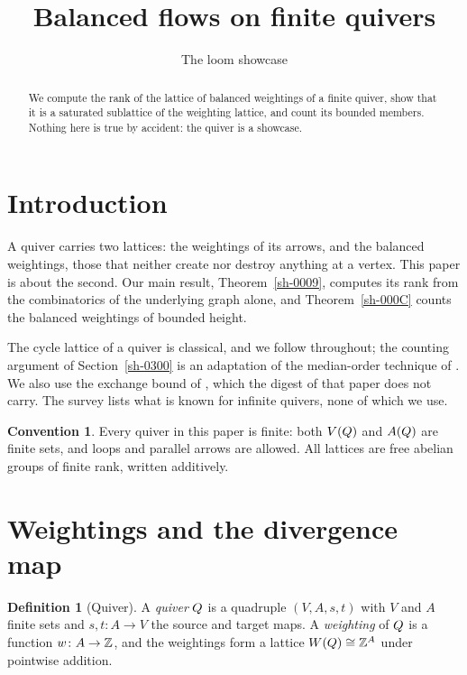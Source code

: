 \documentclass[11pt]{amsart}
\title{Balanced flows on finite quivers}
\author{The loom showcase}
\theoremstyle{plain}
\theoremstyle{definition}
\newtheorem{definition}[theorem]{Definition}
\newtheorem{convention}[theorem]{Convention}
\theoremstyle{remark}
\begin{document}
\maketitle

\begin{abstract}
We compute the rank of the lattice of balanced weightings of a finite quiver, show that it is a saturated sublattice of the weighting lattice, and count its bounded members. Nothing here is true by accident: the quiver is a showcase.
\end{abstract}

\section{Introduction}\label{sh-0100}

A quiver carries two lattices: the weightings of its arrows, and the balanced weightings, those that neither create nor destroy anything at a vertex. This paper is about the second. Our main result, Theorem~\ref{sh-0009}, computes its rank from the combinatorics of the underlying graph alone, and Theorem~\ref{sh-000C} counts the balanced weightings of bounded height.

The cycle lattice of a quiver is classical, and we follow \cite[Proposition 2.1]{Arden24} throughout; the counting argument of Section~\ref{sh-0300} is an adaptation of the median-order technique of \cite[Theorem 2.3]{Bellamy19}. We also use the exchange bound of \cite[Lemma 5.9]{Arden24}, which the digest of that paper does not carry. The survey \cite{Cortez07} lists what is known for infinite quivers, none of which we use.

\begin{convention}\label{sh-0001}
Every quiver in this paper is finite: both $V(Q)$ and $A(Q)$ are finite sets, and loops and parallel arrows are allowed. All lattices are free abelian groups of finite rank, written additively.
\end{convention}

\section{Weightings and the divergence map}\label{sh-0200}

\begin{definition}[Quiver]\label{sh-0002}
A \emph{quiver} $Q$ is a quadruple $(V, A, s, t)$ with $V$ and $A$ finite sets and $s, t \colon A \to V$ the source and target maps. A \emph{weighting} of $Q$ is a function $w \colon A \to \mathbb{Z}$, and the weightings form a lattice $W(Q) \cong \mathbb{Z}^{A}$ under pointwise addition.
\end{definition}
\end{document}
